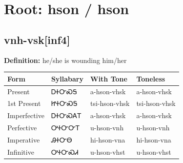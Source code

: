 \documentclass{article}%
\begin{document}
%
\normalsize%
\section*{Root: hson / hson}%
\subsection*{vnh-vsk[inf4]}%
\textbf{Definition: }%
he/she is wounding him/her%
\\[0.5em]%
\begin{tabular}{|l|l|l|l|}%
\hline%
\textbf{Form}&\textbf{Syllabary}&\textbf{With Tone}&\textbf{Toneless}\\%
\hline%
Present&ᎠᏐᏅᏍᎦ&a{-}hson{-}vhsk&a{-}hson{-}vhsk\\%
1st Present&ᏥᏐᏅᏍᎦ&tsi{-}hson{-}vhsk&tsi{-}hson{-}vhsk\\%
Imperfective&ᎠᏐᏅᏍᎪᎢ&a{-}hson{-}vhsk&a{-}hson{-}vhsk\\%
Perfective&ᎤᏐᏅᏅᎢ&u{-}hson{-}vnh&u{-}hson{-}vnh\\%
Imperative&ᎯᏐᏅᎾ&hi{-}hson{-}vna&hi{-}hson{-}vna\\%
Infinitive&ᎤᏐᏅᏍᏗ&u{-}hson{-}vhst&u{-}hson{-}vhst\\%
\hline%
\end{tabular}%
\\[1em]%
\end{document}
